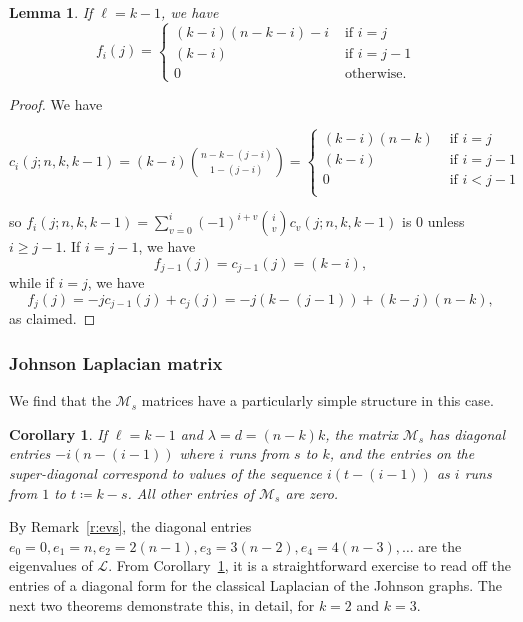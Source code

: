 \documentclass[11pt]{article}
\newtheorem{corollary}[theo]{Corollary}
\newtheorem{lemma}[theo]{Lemma}
\theoremstyle{definition}
\numberwithin{equation}{section}
\numberwithin{equation}{section}
\renewcommand{\L}{\mathcal{L}}
\newcommand{\M}{\mathcal{M}}
\begin{document}
\begin{lemma}\label{l:johnson_M}
If $\ell = k-1$, we have
\[ f_{i}(j) = \begin{cases} 
 (k-i)(n-k-i) - i   & \text{ if $i = j$ } \\
 (k-i)       & \text{ if $i = j-1$ } \\
 0       & \text{ otherwise. }
\end{cases} \]
\end{lemma}
\begin{proof}
We have

$c_i(j; n, k, k-1) = (k-i) \binom{n-k-(j-i)}{1-(j-i)} 
= \begin{cases}
    (k-i) (n-k) & \text{ if $i = j$ } \\
    (k-i)  & \text{ if $i = j-1$ } \\
    0 & \text{ if $i < j-1$ } \\
    \end{cases}$

\noindent
so $f_i(j; n, k, k-1) = \sum_{v=0}^i (-1)^{i+v} \binom{i}{v} c_v(j; n, k, k-1)$ is $0$ unless $i \geq j-1$.
If $i = j-1$, we have
\[ f_{j-1}(j) = c_{j-1}(j) = (k-i), \]
while if $i = j$, we have
\[ f_j(j) = - j c_{j-1}(j) + c_j(j) = -j (k-(j-1)) +  (k-j) (n-k), \]
as claimed.
\end{proof}


\subsubsection{Johnson Laplacian matrix}

We find that the $\M_s$ matrices have a particularly simple structure in this case.

\begin{corollary}\label{c:johnson} 
If $\ell = k-1$ and $\lambda = d = (n-k)k$, the matrix $\M_s$ has diagonal entries $-i(n-(i-1))$ where $i$ runs from $s$ to $k$, and the entries on the super-diagonal correspond to values of the sequence $i(t-(i-1))$ as $i$ runs from $1$ to $t \coloneqq  k-s$.  All other entries of $\M_s$ are zero.
\end{corollary}

By Remark~\ref{r:evs}, the diagonal entries $e_0 = 0, e_1 = n, e_2 = 2(n-1), e_3 = 3(n-2), e_4 = 4(n-3), \ldots$ are the eigenvalues of $\L$.  From Corollary~\ref{c:johnson}, it is a straightforward exercise to read off the entries of a diagonal form for the classical Laplacian of the Johnson graphs.  The next two theorems demonstrate this, in detail, for $k = 2$ and $k = 3$.
\end{document}
